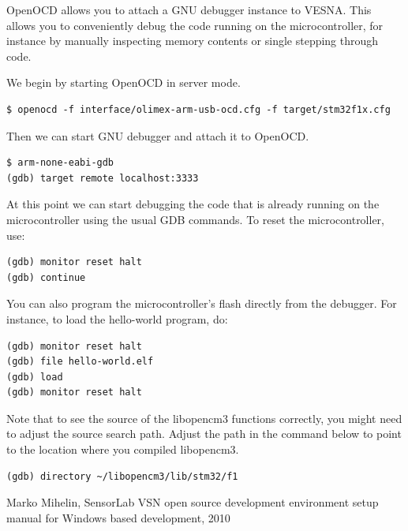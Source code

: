 \documentclass[a4paper, 10pt]{article}
\begin{document}
OpenOCD allows you to attach a GNU debugger instance to VESNA. This allows you
to conveniently debug the code running on the microcontroller, for instance by
manually inspecting memory contents or single stepping through code.

We begin by starting OpenOCD in server mode.

\begin{verbatim}
$ openocd -f interface/olimex-arm-usb-ocd.cfg -f target/stm32f1x.cfg
\end{verbatim}

Then we can start GNU debugger and attach it to OpenOCD.

\begin{verbatim}
$ arm-none-eabi-gdb
(gdb) target remote localhost:3333
\end{verbatim}

At this point we can start debugging the code that is already running on the
microcontroller using the usual GDB commands. To reset the microcontroller, use:

\begin{verbatim}
(gdb) monitor reset halt
(gdb) continue
\end{verbatim}

You can also program the microcontroller's flash directly from the debugger. For
instance, to load the hello-world program, do:

\begin{verbatim}
(gdb) monitor reset halt
(gdb) file hello-world.elf
(gdb) load
(gdb) monitor reset halt
\end{verbatim}

Note that to see the source of the libopencm3 functions correctly, you might
need to adjust the source search path. Adjust the path in the command below to
point to the location where you compiled libopencm3.

\begin{verbatim}
(gdb) directory ~/libopencm3/lib/stm32/f1
\end{verbatim}

\newpage

\begin{thebibliography}{9}
   Marko Mihelin, SensorLab VSN open source development environment setup manual for Windows based development,
   2010

\end{thebibliography}
\end{document}

